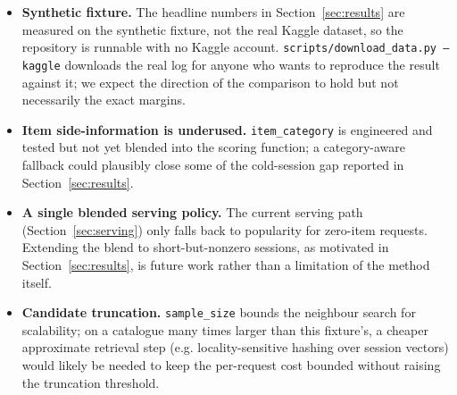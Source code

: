\begin{itemize}
  \item \textbf{Synthetic fixture.} The headline numbers in
        Section~\ref{sec:results} are measured on the synthetic fixture, not
        the real Kaggle dataset, so the repository is runnable with no
        Kaggle account. \texttt{scripts/download\_data.py --kaggle}
        downloads the real log for anyone who wants to reproduce the result
        against it; we expect the direction of the comparison to hold but
        not necessarily the exact margins.
  \item \textbf{Item side-information is underused.} \texttt{item\_category}
        is engineered and tested but not yet blended into the scoring
        function; a category-aware fallback could plausibly close some of
        the cold-session gap reported in Section~\ref{sec:results}.
  \item \textbf{A single blended serving policy.} The current serving path
        (Section~\ref{sec:serving}) only falls back to popularity for
        zero-item requests. Extending the blend to short-but-nonzero
        sessions, as motivated in Section~\ref{sec:results}, is future work
        rather than a limitation of the method itself.
  \item \textbf{Candidate truncation.} \texttt{sample\_size} bounds the
        neighbour search for scalability; on a catalogue many times larger
        than this fixture's, a cheaper approximate retrieval step (e.g.
        locality-sensitive hashing over session vectors) would likely be
        needed to keep the per-request cost bounded without raising the
        truncation threshold.
\end{itemize}
